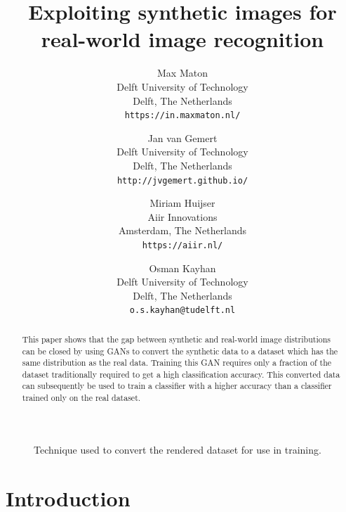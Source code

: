 \documentclass[10pt,twocolumn,letterpaper]{article}
\begin{document}
\title{ Exploiting synthetic images for real-world image recognition }

\author{Max Maton\\
Delft University of Technology\\
Delft, The Netherlands\\
{\tt\small https://in.maxmaton.nl/}
\and
Jan van Gemert\\
Delft University of Technology\\
Delft, The Netherlands\\
{\tt\small http://jvgemert.github.io/}
\and
Miriam Huijser\\
Aiir Innovations\\
Amsterdam, The Netherlands\\
{\tt\small https://aiir.nl/}
\and
Osman Kayhan\\
Delft University of Technology\\
Delft, The Netherlands\\
{\tt\small o.s.kayhan@tudelft.nl}
}

\maketitle

\begin{abstract}

This paper shows that the gap between synthetic and real-world image distributions can be closed by using GANs to convert the synthetic data to a dataset which has the same distribution as the real data. Training this GAN requires only a fraction of the dataset traditionally required to get a high classification accuracy. This converted data can subsequently be used to train a classifier with a higher accuracy than a classifier trained only on the real dataset.

\end{abstract}

\begin{figure}[h]
\begin{center}
{\scriptsize }
\end{center}
   \caption{Technique used to convert the rendered dataset for use in training.}
\label{fig:method}
\end{figure}

\section{Introduction}
\end{document}
